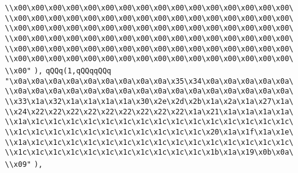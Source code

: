 \verb|\\x00\x00\x00\x00\x00\x00\x00\x00\x00\x00\x00\x00\x00\x00\x00\x00\|\newline
\verb|\\x00\x00\x00\x00\x00\x00\x00\x00\x00\x00\x00\x00\x00\x00\x00\x00\|\newline
\verb|\\x00\x00\x00\x00\x00\x00\x00\x00\x00\x00\x00\x00\x00\x00\x00\x00\|\newline
\verb|\\x00\x00\x00\x00\x00\x00\x00\x00\x00\x00\x00\x00\x00\x00\x00\x00\|\newline
\verb|\\x00\x00\x00\x00\x00\x00\x00\x00\x00\x00\x00\x00\x00\x00\x00\x00\|\newline
\verb|\\x00\x00\x00\x00\x00\x00\x00\x00\x00\x00\x00\x00\x00\x00\x00\x00\|\newline
\verb|\\x00"|\newline
\verb|),|\newline
\verb|qQQq(1,qQQqqQQq|\newline
\verb|"\x0a\x0a\x0a\x0a\x0a\x0a\x0a\x0a\x0a\x35\x34\x0a\x0a\x0a\x0a\x0a\|\newline
\verb|\\x0a\x0a\x0a\x0a\x0a\x0a\x0a\x0a\x0a\x0a\x0a\x0a\x0a\x0a\x0a\x0a\|\newline
\verb|\\x33\x1a\x32\x1a\x1a\x1a\x1a\x30\x2e\x2d\x2b\x1a\x2a\x1a\x27\x1a\|\newline
\verb|\\x24\x22\x22\x22\x22\x22\x22\x22\x22\x22\x1a\x21\x1a\x1a\x1a\x1a\|\newline
\verb|\\x1a\x1c\x1c\x1c\x1c\x1c\x1c\x1c\x1c\x1c\x1c\x1c\x1c\x1c\x1c\x1c\|\newline
\verb|\\x1c\x1c\x1c\x1c\x1c\x1c\x1c\x1c\x1c\x1c\x1c\x20\x1a\x1f\x1a\x1e\|\newline
\verb|\\x1a\x1c\x1c\x1c\x1c\x1c\x1c\x1c\x1c\x1c\x1c\x1c\x1c\x1c\x1c\x1c\|\newline
\verb|\\x1c\x1c\x1c\x1c\x1c\x1c\x1c\x1c\x1c\x1c\x1c\x1b\x1a\x19\x0b\x0a\|\newline
\verb|\\x09"|\newline
\verb|),|\newline
